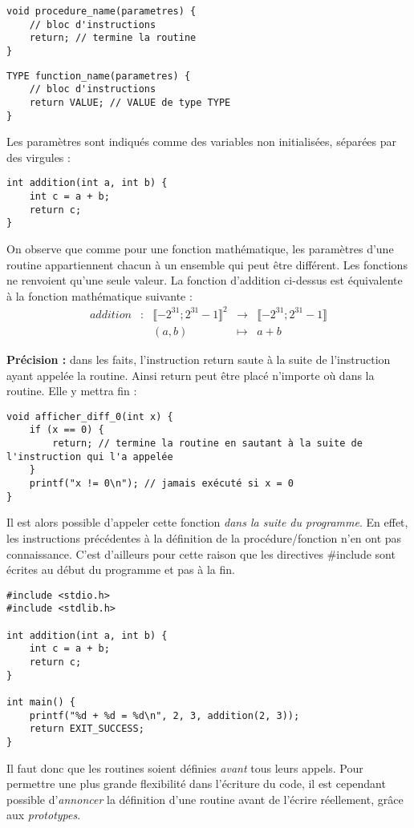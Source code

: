 \documentclass[../../../main.tex]{subfiles}
\begin{document}
\begin{minipage}{0.5\textwidth}
\begin{verbatim}
void procedure_name(parametres) {
	// bloc d'instructions
	return; // termine la routine
}
\end{verbatim}
\end{minipage}
\begin{minipage}{0.5\textwidth}
\begin{verbatim}
TYPE function_name(parametres) {
	// bloc d'instructions
	return VALUE; // VALUE de type TYPE
}
\end{verbatim}
\end{minipage}

Les paramètres sont indiqués comme des variables non initialisées, séparées par des virgules :
\begin{verbatim}
int addition(int a, int b) {
	int c = a + b;
	return c;
}
\end{verbatim}
On observe que comme pour une fonction mathématique, les paramètres d'une routine appartiennent chacun à un ensemble qui peut être différent. Les fonctions ne renvoient qu'une seule valeur. La fonction d'addition ci-dessus est équivalente à la fonction mathématique suivante :
$$
\begin{array}{ccccl}
addition & : & \llbracket{-2^{31}}; 2^{31}-1\rrbracket^{2} & \rightarrow & \llbracket{-2^{31}}; 2^{31}-1\rrbracket \\
 & & (a, b) & \mapsto & a + b
\end{array}
$$

\textbf{Précision :} dans les faits, l'instruction \textsf{return} saute à la suite de l'instruction ayant appelée la routine. Ainsi \textsf{return} peut être placé n'importe où dans la routine. Elle y mettra fin :
\begin{verbatim}
void afficher_diff_0(int x) {
	if (x == 0) {
		return; // termine la routine en sautant à la suite de l'instruction qui l'a appelée
	}
	printf("x != 0\n"); // jamais exécuté si x = 0
}
\end{verbatim}

Il est alors possible d'appeler cette fonction \textit{dans la suite du programme}. En effet, les instructions précédentes à la définition de la procédure/fonction n'en ont pas connaissance. C'est d'ailleurs pour cette raison que les directives \textsf{\#include} sont écrites au début du programme et pas à la fin.
\begin{verbatim}
#include <stdio.h>
#include <stdlib.h>

int addition(int a, int b) {
	int c = a + b;
	return c;
}

int main() {
	printf("%d + %d = %d\n", 2, 3, addition(2, 3));
	return EXIT_SUCCESS;
}
\end{verbatim}
Il faut donc que les routines soient définies \textit{avant} tous leurs appels. Pour permettre une plus grande flexibilité dans l'écriture du code, il est cependant possible d'\textit{annoncer} la définition d'une routine avant de l'écrire réellement, grâce aux \textit{prototypes}.
\end{document}

